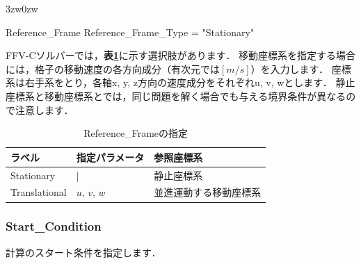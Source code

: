 \begin{indentation}{3zw}{0zw}
\small

\begin{program}
  Reference_Frame {
    Reference_Frame_Type = "Stationary"
  }

\end{program}

\normalsize
FFV-Cソルバーでは，\textbf{表\ref{tbl:ref_frame}}に示す選択肢があります．
移動座標系を指定する場合には，格子の移動速度の各方向成分（有次元では$[m/s]$）を入力します．
座標系は右手系をとり，各軸x, y, z方向の速度成分をそれぞれu, v, wとします．
静止座標系と移動座標系とでは，同じ問題を解く場合でも与える境界条件が異なるので注意します．

\begin{table}[htdp]
\caption{Reference\_Frameの指定}
\begin{center}
\small
\begin{tabular}{lll} \toprule
ラベル & 指定パラメータ & 参照座標系\\ \midrule
Stationary & | & 静止座標系\\
Translational & $u,\,v,\,w$ & 並進運動する移動座標系\\ \bottomrule
\end{tabular}
\end{center}
\label{tbl:ref_frame}
\end{table}

\end{indentation}



\pagebreak
\subsubsection{Start\_Condition}

計算の\hypertarget{tgt:start_condition}{スタート条件}を指定します．

